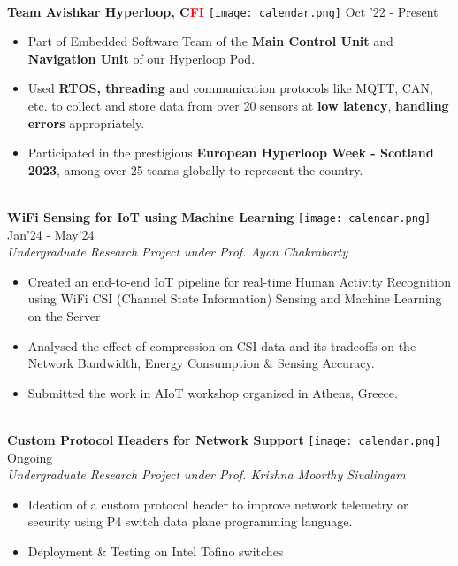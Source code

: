 \documentclass[10pt,article]{article}
\newcommand{\myMargin}{0.15in}
\newcommand{\myfont}[2]{\fontsize{#1}{#1}\selectfont #2}
\newcommand{\projecttopic}[1]{\myfont{9pt}{\textbf{#1}}}
\newcommand{\projectdesc}[1]{\myfont{9pt}{\textcolor{projDescColor}{\textit{#1}}}}
\newcommand{\mycal}[1]{\texttt{[image: calendar.png]} \myfont{9}{#1}}
\begin{document}
\begin{multicols*}{2}
\noindent
\hrulefill \\ [-0.5cm]
\projecttopic{Team Avishkar Hyperloop, C\textcolor{red}{FI}} \hfill \mycal{Oct '22 - Present} 
\begin{itemize}[leftmargin=\myMargin]
    \setlength \itemsep{-0.1em}
    \item Part of Embedded Software Team of the \textbf{Main Control Unit} and \\ \textbf{Navigation Unit} of our Hyperloop Pod. 
    \item Used \textbf{RTOS, threading} and communication protocols like MQTT, CAN, etc. to collect and store data from over 20 sensors at \textbf{low latency}, \textbf{handling errors} appropriately.
    \item Participated in the prestigious \textbf{European Hyperloop Week - Scotland 2023}, 
    among over 25 teams globally to represent the country.
\end{itemize}
\vspace{3pt}
\noindent
\hrulefill \\ [-0.45cm]
\projecttopic{WiFi Sensing for IoT using Machine Learning} \hfill  \mycal{Jan'24 - May'24}\\[0.1cm]
\projectdesc{Undergraduate Research Project under Prof. Ayon Chakraborty}  
\begin{itemize}[leftmargin=\myMargin]
    \setlength \itemsep{-0.1em}
    \item Created an end-to-end IoT pipeline for real-time Human Activity Recognition using WiFi CSI (Channel State Information) Sensing and Machine Learning on the Server
    \item Analysed the effect of compression on CSI data and its tradeoffs on the Network Bandwidth, Energy Consumption \& Sensing Accuracy.
    \item Submitted the work in AIoT workshop organised in Athens, Greece. 
\end{itemize}
\vspace{3pt}
\noindent
\hrulefill \\ [-0.45cm]
\projecttopic{Custom Protocol Headers for Network Support} \hfill \mycal{Ongoing}\\[0.1cm]
\projectdesc{Undergraduate Research Project under Prof. Krishna Moorthy Sivalingam}  
\vspace{1pt}
\begin{itemize}[leftmargin=\myMargin]
    \setlength \itemsep{-0.1em}
    \item Ideation of a custom protocol header to improve network telemetry or security using P4 switch data plane programming language.
    \item Deployment \& Testing on Intel Tofino switches  
\end{itemize}
\vspace{3pt}


\end{multicols*}
\end{document}
